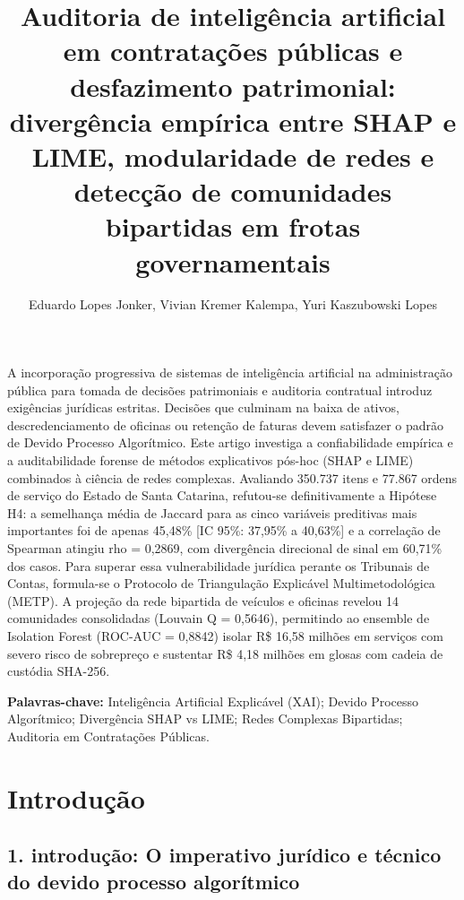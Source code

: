 \documentclass[12pt,a4paper]{article}
\title{\textbf{Auditoria de inteligência artificial em contratações públicas e desfazimento patrimonial: divergência empírica entre SHAP e LIME, modularidade de redes e detecção de comunidades bipartidas em frotas governamentais}}
\author{Eduardo Lopes Jonker\inst{1}, Vivian Kremer Kalempa\inst{1}, Yuri Kaszubowski Lopes\inst{1}}
\begin{document}
\maketitle

\begin{resumo}
A incorporação progressiva de sistemas de inteligência artificial na administração pública para tomada de decisões patrimoniais e auditoria contratual introduz exigências jurídicas estritas. Decisões que culminam na baixa de ativos, descredenciamento de oficinas ou retenção de faturas devem satisfazer o padrão de Devido Processo Algorítmico. Este artigo investiga a confiabilidade empírica e a auditabilidade forense de métodos explicativos pós-hoc (SHAP e LIME) combinados à ciência de redes complexas. Avaliando 350.737 itens e 77.867 ordens de serviço do Estado de Santa Catarina, refutou-se definitivamente a Hipótese H4: a semelhança média de Jaccard para as cinco variáveis preditivas mais importantes foi de apenas 45,48\% [IC 95\%: 37,95\% a 40,63\%] e a correlação de Spearman atingiu rho = 0,2869, com divergência direcional de sinal em 60,71\% dos casos. Para superar essa vulnerabilidade jurídica perante os Tribunais de Contas, formula-se o Protocolo de Triangulação Explicável Multimetodológica (METP). A projeção da rede bipartida de veículos e oficinas revelou 14 comunidades consolidadas (Louvain Q = 0,5646), permitindo ao ensemble de Isolation Forest (ROC-AUC = 0,8842) isolar R\$ 16,58 milhões em serviços com severo risco de sobrepreço e sustentar R\$ 4,18 milhões em glosas com cadeia de custódia SHA-256.

\vspace{0.2cm}
\noindent\textbf{Palavras-chave:} Inteligência Artificial Explicável (XAI); Devido Processo Algorítmico; Divergência SHAP vs LIME; Redes Complexas Bipartidas; Auditoria em Contratações Públicas.
\end{resumo}



\section{Introdução}


\subsection{1. introdução: O imperativo jurídico e técnico do devido processo algorítmico}
\end{document}
